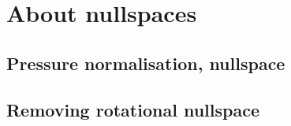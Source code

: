 \newpage %
\section{About nullspaces} 
\subsection{Pressure normalisation, nullspace\label{ss_pnorm}}  %
\subsection{Removing rotational nullspace\label{ss_nullspace}}  %

